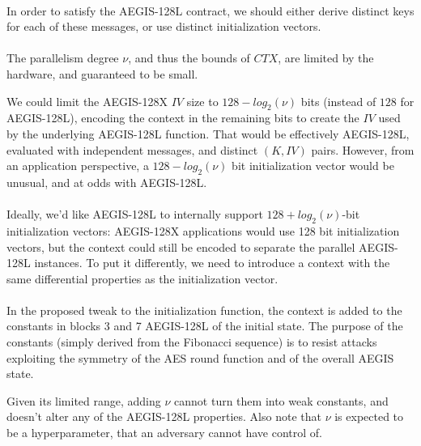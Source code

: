 \documentclass[envcountsame,runningheads,notitlepage]{llncs}
\begin{document}
\paragraph{}

In order to satisfy the AEGIS-128L contract, we should either derive distinct keys for each of these messages, or use distinct initialization vectors.

\paragraph{}

The parallelism degree $\nu$, and thus the bounds of $CTX$, are limited by the hardware, and guaranteed to be small.

We could limit the AEGIS-128X $IV$ size to $128-log_2(\nu)$ bits (instead of $128$ for AEGIS-128L), encoding the context in the remaining bits to create the $IV$ used by the underlying AEGIS-128L function.
That would be effectively AEGIS-128L, evaluated with independent messages, and distinct $(K, IV)$ pairs.
However, from an application perspective, a $128-log_2(\nu)$ bit initialization vector would be unusual, and at odds with AEGIS-128L.

\paragraph{}

Ideally, we'd like AEGIS-128L to internally support $128+log_2(\nu)$-bit initialization vectors: AEGIS-128X applications would use 128 bit initialization vectors, but the context could still be encoded to separate the parallel AEGIS-128L instances.
To put it differently, we need to introduce a context with the same differential properties as the initialization vector.

\paragraph{}

In the proposed tweak to the initialization function, the context is added to the constants in blocks 3 and 7 AEGIS-128L of the initial state.
The purpose of the constants (simply derived from the Fibonacci sequence) is to resist attacks exploiting the symmetry of the AES round function and of the overall AEGIS state.

Given its limited range, adding $\nu$ cannot turn them into weak constants, and doesn't alter any of the AEGIS-128L properties.
Also note that $\nu$ is expected to be a hyperparameter, that an adversary cannot have control of.
\end{document}
